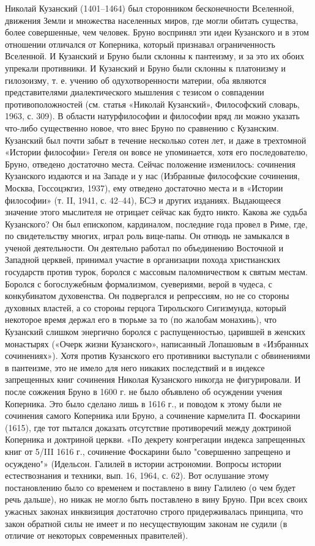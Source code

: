 Николай Кузанский (1401--1464) был сторонником бесконечности Вселенной,
движения Земли и множества населенных миров, где могли обитать существа,
более совершенные, чем человек. Бруно воспринял эти идеи Кузанского и в
этом отношении отличался от Коперника, который признавал ограниченность
Вселенной. И Кузанский и Бруно были склонны к пантеизму, и за это их обоих
упрекали противники. И Кузанский и Бруно были склонны к платонизму и
гилозоизму, т. е. учению об одухотворенности материи, оба являются
представителями
диалектического мышления с тезисом о совпадении противоположностей (см.
статья «Николай Кузанский», Философский словарь, 1963, с. 309). В области
натурфилософии и философии вряд ли можно указать что-либо существенно
новое, что внес Бруно по сравнению с Кузанским. Кузанский был почти забыт в
течение несколько сотен лет, и даже в трехтомной «Истории философии» Гегеля он
вовсе не упоминается, хотя его последователю, Бруно, отведено достаточно
места. Сейчас положение изменилось: сочинения Кузанского издаются и на
Западе и у нас (Избранные философские сочинения, Москва, Госсоцэкгиз,
1937), ему отведено достаточно места и в «Истории философии» (т. II, 1941, с.
42--44), БСЭ и других изданиях. Выдающееся значение этого мыслителя не
отрицает сейчас как будто никто. Какова же судьба Кузанского? Он был
епископом, кардиналом, последние года провел в Риме, где, по свидетельству
многих, играл роль вице-папы. Он отнюдь не замыкался в ученой деятельности. Он
деятельно работал по объединению Восточной и Западной церквей, принимал
участие в организации похода христианских государств против турок, боролся с
массовым паломничеством к святым местам. Боролся с богослужебным
формализмом, суевериями, верой в чудеса, с конкубинатом духовенства. Он
подвергался и репрессиям, но не со стороны духовных властей, а со стороны
герцога Тирольского Сигизмунда, который некоторое время держал его в тюрьме за
то (по жалобам монахинь), что Кузанский слишком энергично боролся с
распущенностью, царившей в женских монастырях («Очерк жизни Кузанского»,
написанный Лопашовым в «Избранных сочинениях»). Хотя против Кузанского его
противники выступали с обвинениями в пантеизме, это не имело для него
никаких последствий и в индексе запрещенных книг сочинения Николая
Кузанского никогда не фигурировали. И после сожжения Бруно в 1600 г. не
было объявлено об осуждении учения Коперника. Это было сделано лишь в 1616 г.,
и поводом к этому были не сочинения самого Коперника или Бруно, а сочинение
кармелита П. Фоскарини (1615), где тот пытался доказать отсутствие
противоречий между доктриной Коперника и доктриной церкви. «По декрету
конгрегации индекса запрещенных книг от 5/III 1616 г., сочинение Фоскарини
было "совершенно запрещено и осуждено"» (Идельсон. Галилей в истории
астрономии. Вопросы истории естествознания и техники, вып. 16, 1964, с.
62). Вот ослушание этому постановлению было со временем и поставлено в вину
Галилею (о чем будет речь дальше), но никак не могло быть поставлено в вину
Бруно. При всех своих ужасных законах инквизиция достаточно строго
придерживалась принципа, что закон обратной силы не имеет и по
несуществующим законам не судили (в отличие от некоторых современных
правителей).

